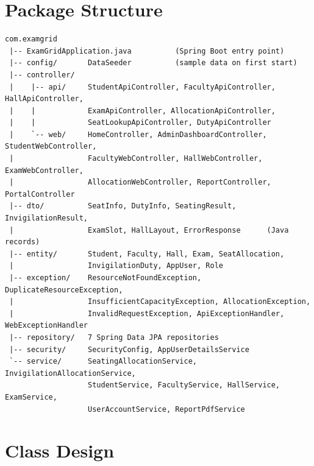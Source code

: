 \documentclass[11pt,a4paper]{article}
\begin{document}
\section{Package Structure}
\begin{lstlisting}[style=plain]
com.examgrid
 |-- ExamGridApplication.java          (Spring Boot entry point)
 |-- config/       DataSeeder          (sample data on first start)
 |-- controller/
 |    |-- api/     StudentApiController, FacultyApiController, HallApiController,
 |    |            ExamApiController, AllocationApiController,
 |    |            SeatLookupApiController, DutyApiController
 |    `-- web/     HomeController, AdminDashboardController, StudentWebController,
 |                 FacultyWebController, HallWebController, ExamWebController,
 |                 AllocationWebController, ReportController, PortalController
 |-- dto/          SeatInfo, DutyInfo, SeatingResult, InvigilationResult,
 |                 ExamSlot, HallLayout, ErrorResponse      (Java records)
 |-- entity/       Student, Faculty, Hall, Exam, SeatAllocation,
 |                 InvigilationDuty, AppUser, Role
 |-- exception/    ResourceNotFoundException, DuplicateResourceException,
 |                 InsufficientCapacityException, AllocationException,
 |                 InvalidRequestException, ApiExceptionHandler, WebExceptionHandler
 |-- repository/   7 Spring Data JPA repositories
 |-- security/     SecurityConfig, AppUserDetailsService
 `-- service/      SeatingAllocationService, InvigilationAllocationService,
                   StudentService, FacultyService, HallService, ExamService,
                   UserAccountService, ReportPdfService
\end{lstlisting}

\section{Class Design}
\end{document}
